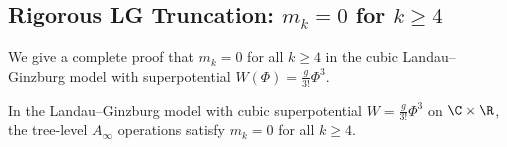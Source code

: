 \subsection{Rigorous LG Truncation: $m_k = 0$ for $k \geq 4$}
\label{subsec:truncation_complete}

We give a complete proof that $m_k = 0$ for all $k \geq 4$ in the cubic Landau--Ginzburg model with superpotential $W(\Phi) = \frac{g}{3!}\Phi^3$.

\begin{theorem}
\label{thm:LG_truncation_full}
In the Landau--Ginzburg model with cubic superpotential $W = \frac{g}{3!}\Phi^3$ on $\C \times \R$, the tree-level $A_\infty$ operations satisfy $m_k = 0$ for all $k \geq 4$.
\end{theorem}

